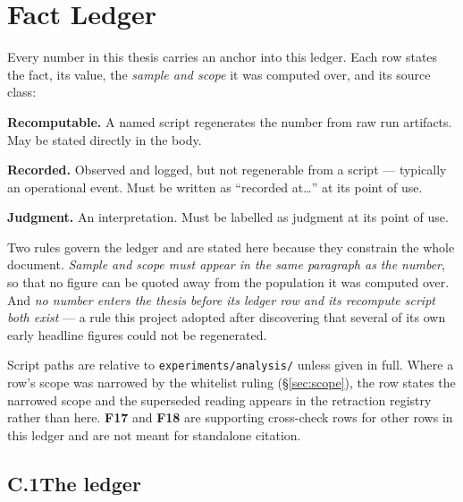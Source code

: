 \chapter{Fact Ledger}
\label{app:ledger}

Every number in this thesis carries an \F{} anchor into this ledger. Each
row states the fact, its value, the \emph{sample and scope} it was computed
over, and its source class:

\begin{description}[leftmargin=3em,style=nextline]
  \item[\textnormal{\cls{A}}] \textbf{Recomputable.} A named script
        regenerates the number from raw run artifacts. May be stated
        directly in the body.
  \item[\textnormal{\cls{B}}] \textbf{Recorded.} Observed and logged, but
        not regenerable from a script --- typically an operational event.
        Must be written as ``recorded at\ldots'' at its point of use.
  \item[\textnormal{\cls{C}}] \textbf{Judgment.} An interpretation. Must be
        labelled as judgment at its point of use.
\end{description}

Two rules govern the ledger and are stated here because they constrain the
whole document. \emph{Sample and scope must appear in the same paragraph as
the number}, so that no figure can be quoted away from the population it
was computed over. And \emph{no number enters the thesis before its ledger
row and its recompute script both exist} --- a rule this project adopted
after discovering that several of its own early headline figures could not
be regenerated.

Script paths are relative to \texttt{experiments/analysis/} unless given in
full. Where a row's scope was narrowed by the whitelist ruling
(\S\ref{sec:scope}), the row states the narrowed scope and the superseded
reading appears in the retraction registry rather than here. \textbf{F17}
and \textbf{F18} are supporting cross-check rows for other rows in this
ledger and are not meant for standalone citation.

\section*{C.1\quad The ledger}

